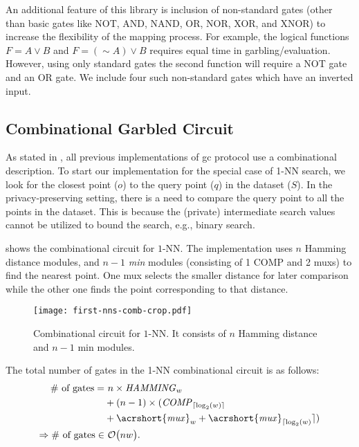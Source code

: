An additional feature of this library is inclusion of non-standard gates (other than basic gates like NOT, AND, NAND, OR, NOR, XOR, and XNOR) to increase the flexibility of the mapping process.
For example, the logical functions $F = A\vee B$ and $F = (\sim A)\vee B$ requires equal time in garbling/evaluation.
However, using only standard gates the second function will require a NOT gate and an OR gate.
We include four such non-standard gates which have an inverted input.

\subsection{Combinational Garbled Circuit}\label{ssec:knn-combgc}
As stated in , all previous implementations of \acrshort{gc} protocol use a combinational description.
To start our implementation for the special case of 1-NN search, we look for the closest point ($o$) to the query point ($q$) in the dataset ($S$).
In the privacy-preserving setting, there is a need to compare the query point to all the points in the dataset.
This is because the (private) intermediate search values cannot be utilized to bound the search, e.g., binary search.

 shows the combinational circuit for $1$-NN.
The implementation uses $n$ Hamming distance modules, and $n-1$ \emph{min} modules (consisting of 1 COMP and 2 \acrshort{mux}s) to find the nearest point.
One \acrshort{mux} selects the smaller distance for later comparison while the other one finds the point corresponding to that distance.

\begin{figure}
\centering
\texttt{[image: first-nns-comb-crop.pdf]}
\caption{Combinational circuit for $1$-NN.
It consists of $n$ Hamming distance and $n-1$ min modules.}
\label{fig:fist-nns-comb}
\end{figure}

The total number of gates in the 1-NN combinational circuit is as follows:
\begin{align*}
\text{\# of gates} =& ~	n \times \mathit{HAMMING}_{w}\\
					& + (n-1) \times (\mathit{COMP}_{\lceil \log _2(w) \rceil} \\
					& + \mathit{\acrshort{mux}}_w + \mathit{\acrshort{mux}}_{\lceil \log _2(w)} \rceil)\\
\Rightarrow \text{\# of gates} \in & ~\BigO{nw}.
\end{align*}

